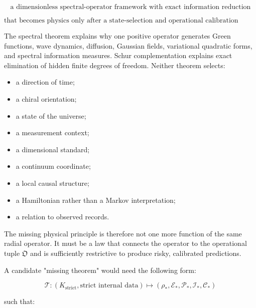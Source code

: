 \documentclass[11pt,a4paper,openany]{report}
\begin{document}
\[
\boxed{
\text{a dimensionless spectral-operator framework with exact information reduction}
}
\]

\[
\boxed{
\text{that becomes physics only after a state-selection and operational calibration functor is supplied.}
}
\]

The spectral theorem explains why one positive operator generates Green functions, wave dynamics, diffusion, Gaussian fields, variational quadratic forms, and spectral information measures. Schur complementation explains exact elimination of hidden finite degrees of freedom. Neither theorem selects:

\begin{itemize}
\item 
a direction of time;

\item 
a chiral orientation;

\item 
a state of the universe;

\item 
a measurement context;

\item 
a dimensional standard;

\item 
a continuum coordinate;

\item 
a local causal structure;

\item 
a Hamiltonian rather than a Markov interpretation;

\item 
a relation to observed records.

\end{itemize}

The missing physical principle is therefore not one more function of the same radial operator. It must be a law that connects the operator to the operational tuple \(\mathfrak O\) and is sufficiently restrictive to produce risky, calibrated predictions.

A candidate "missing theorem" would need the following form:

\[
\mathcal T:
(K_{\mathrm{strict}},\text{strict internal data})
\longmapsto
(\rho_*,\mathcal E_*,\mathcal P_*,\mathcal I_*,\mathcal C_*)
\]

such that:
\end{document}
